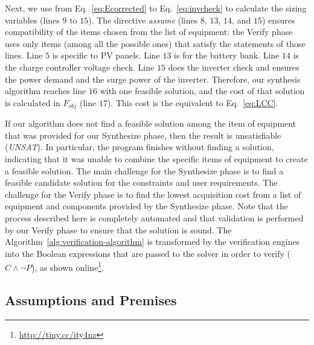 \documentclass[journal]{IEEEtran}
\begin{document}
Next, we use from Eq.~\eqref{eq:Ecorrected} to Eq.~\eqref{eq:invcheck} to calculate the sizing variables (lines $9$ to $15$). The directive \textit{assume} (lines $8$, $13$, $14$, and $15$) ensures compatibility of the items chosen from the list of equipment: the {\sc Verify} phase uses only items (among all the possible ones) that satisfy the statements of those lines. Line $5$ is specific to PV panels. Line $13$ is for the battery bank. Line $14$ is the charge controller voltage check. Line $15$ does the inverter check and ensures the power demand and the surge power of the inverter.
Therefore, our synthesis algorithm reaches line $16$ with one feasible solution, and the cost of that solution is calculated in $F_{obj}$ (line $17$). This cost is the equivalent to Eq.~\eqref{eq:LCC}.

If our algorithm does not find a feasible solution among the item of equipment that was provided for our {\sc Synthesize} phase, then the result is unsatisfiable (\textit{UNSAT}). In particular, the program finishes without finding a solution, indicating that it was unable to combine the specific items of equipment to create a feasible solution. 
%
The main challenge for the {\sc Synthesize} phase is to find a feasible candidate solution for the constraints and user requirements. The challenge for the {\sc Verify} phase is to find the lowest acquisition cost from a list of equipment and components provided by the {\sc Synthesize} phase. 
%
Note that the process described here is completely automated and that validation is performed by our {\sc Verify} phase to ensure that the solution is sound.
The Algorithm~\ref{alg:verification-algorithm} is transformed by the verification engines into the Boolean expressions that are passed to the solver in order to verify ($C \wedge \neg P$), as shown online\footnote{\url{http://tiny.cc/ity4nz}}.

\subsection{Assumptions and Premises}
%
\end{document}
